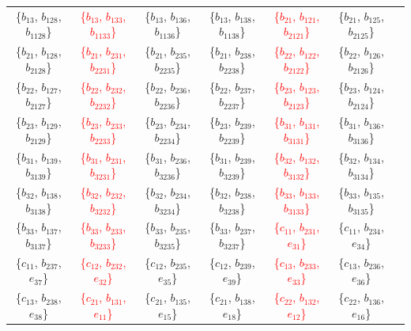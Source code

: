 \documentclass[%
  reprint,
  superscriptaddress,
  showpacs,
  showkeys,
  amsmath,amssymb,
  pra,
  longbibliography,
  floatfix,
  x11names
]{revtex4-2}
\begin{document}
\begin{table}[htbp!]
\begin{ruledtabular}
\begin{tabular}{ccccccc}
\{$b_{13}$, $b_{128}$, $b_{1128}$\} & \textcolor{red}{\{$b_{13}$, $b_{133}$, $b_{1133}$\}} & \{$b_{13}$, $b_{136}$, $b_{1136}$\} & \{$b_{13}$, $b_{138}$, $b_{1138}$\} & \textcolor{red}{\{$b_{21}$, $b_{121}$, $b_{2121}$\}} & \{$b_{21}$, $b_{125}$, $b_{2125}$\} \\
\{$b_{21}$, $b_{128}$, $b_{2128}$\} & \textcolor{red}{\{$b_{21}$, $b_{231}$, $b_{2231}$\}} & \{$b_{21}$, $b_{235}$, $b_{2235}$\} & \{$b_{21}$, $b_{238}$, $b_{2238}$\} & \textcolor{red}{\{$b_{22}$, $b_{122}$, $b_{2122}$\}} & \{$b_{22}$, $b_{126}$, $b_{2126}$\} \\
\{$b_{22}$, $b_{127}$, $b_{2127}$\} & \textcolor{red}{\{$b_{22}$, $b_{232}$, $b_{2232}$\}} & \{$b_{22}$, $b_{236}$, $b_{2236}$\} & \{$b_{22}$, $b_{237}$, $b_{2237}$\} & \textcolor{red}{\{$b_{23}$, $b_{123}$, $b_{2123}$\}} & \{$b_{23}$, $b_{124}$, $b_{2124}$\} \\
\{$b_{23}$, $b_{129}$, $b_{2129}$\} & \textcolor{red}{\{$b_{23}$, $b_{233}$, $b_{2233}$\}} & \{$b_{23}$, $b_{234}$, $b_{2234}$\} & \{$b_{23}$, $b_{239}$, $b_{2239}$\} & \textcolor{red}{\{$b_{31}$, $b_{131}$, $b_{3131}$\}} & \{$b_{31}$, $b_{136}$, $b_{3136}$\} \\
\{$b_{31}$, $b_{139}$, $b_{3139}$\} & \textcolor{red}{\{$b_{31}$, $b_{231}$, $b_{3231}$\}} & \{$b_{31}$, $b_{236}$, $b_{3236}$\} & \{$b_{31}$, $b_{239}$, $b_{3239}$\} & \textcolor{red}{\{$b_{32}$, $b_{132}$, $b_{3132}$\}} & \{$b_{32}$, $b_{134}$, $b_{3134}$\} \\
\{$b_{32}$, $b_{138}$, $b_{3138}$\} & \textcolor{red}{\{$b_{32}$, $b_{232}$, $b_{3232}$\}} & \{$b_{32}$, $b_{234}$, $b_{3234}$\} & \{$b_{32}$, $b_{238}$, $b_{3238}$\} & \textcolor{red}{\{$b_{33}$, $b_{133}$, $b_{3133}$\}} & \{$b_{33}$, $b_{135}$, $b_{3135}$\} \\
\{$b_{33}$, $b_{137}$, $b_{3137}$\} & \textcolor{red}{\{$b_{33}$, $b_{233}$, $b_{3233}$\}} & \{$b_{33}$, $b_{235}$, $b_{3235}$\} & \{$b_{33}$, $b_{237}$, $b_{3237}$\} & \textcolor{red}{\{$c_{11}$, $b_{231}$, $e_{31}$\}} & \{$c_{11}$, $b_{234}$, $e_{34}$\} \\
\{$c_{11}$, $b_{237}$, $e_{37}$\} & \textcolor{red}{\{$c_{12}$, $b_{232}$, $e_{32}$\}} & \{$c_{12}$, $b_{235}$, $e_{35}$\} & \{$c_{12}$, $b_{239}$, $e_{39}$\} & \textcolor{red}{\{$c_{13}$, $b_{233}$, $e_{33}$\}} & \{$c_{13}$, $b_{236}$, $e_{36}$\} \\
\{$c_{13}$, $b_{238}$, $e_{38}$\} & \textcolor{red}{\{$c_{21}$, $b_{131}$, $e_{11}$\}} & \{$c_{21}$, $b_{135}$, $e_{15}$\} & \{$c_{21}$, $b_{138}$, $e_{18}$\} & \textcolor{red}{\{$c_{22}$, $b_{132}$, $e_{12}$\}} & \{$c_{22}$, $b_{136}$, $e_{16}$\} \\

\end{tabular}
\end{ruledtabular}
\end{table}
\end{document}
